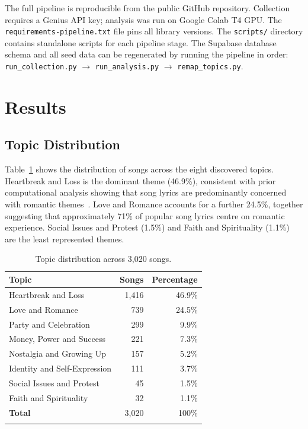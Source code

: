 \documentclass[pdflatex,sn-mathphys-num]{sn-jnl}
\begin{document}
The full pipeline is reproducible from the public GitHub repository. Collection requires a Genius API key; analysis was run on Google Colab T4 GPU. The \texttt{requirements-pipeline.txt} file pins all library versions. The \texttt{scripts/} directory contains standalone scripts for each pipeline stage. The Supabase database schema and all seed data can be regenerated by running the pipeline in order: \texttt{run\_collection.py} $\to$ \texttt{run\_analysis.py} $\to$ \texttt{remap\_topics.py}.

\section{Results}\label{sec5}

\subsection{Topic Distribution}\label{subsec8}

Table~\ref{tab:topics} shows the distribution of songs across the eight discovered topics. Heartbreak and Loss is the dominant theme (46.9\%), consistent with prior computational analysis showing that song lyrics are predominantly concerned with romantic themes~\cite{fell2014lyrics}. Love and Romance accounts for a further 24.5\%, together suggesting that approximately 71\% of popular song lyrics centre on romantic experience. Social Issues and Protest (1.5\%) and Faith and Spirituality (1.1\%) are the least represented themes.

\begin{table}[h]
\caption{Topic distribution across 3,020 songs.}\label{tab:topics}
\begin{tabular}{@{}lrr@{}}
\toprule
\textbf{Topic} & \textbf{Songs} & \textbf{Percentage} \\
\midrule
Heartbreak and Loss           & 1,416 & 46.9\% \\
Love and Romance              &   739 & 24.5\% \\
Party and Celebration         &   299 &  9.9\% \\
Money, Power and Success      &   221 &  7.3\% \\
Nostalgia and Growing Up      &   157 &  5.2\% \\
Identity and Self-Expression  &   111 &  3.7\% \\
Social Issues and Protest     &    45 &  1.5\% \\
Faith and Spirituality        &    32 &  1.1\% \\
\midrule
\textbf{Total}                & 3,020 & 100\%  \\
\botrule
\end{tabular}
\end{table}
\end{document}
